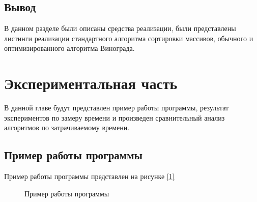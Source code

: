 \documentclass{article}
\begin{document}
	\subsection{Вывод}
	В данном разделе были описаны средства реализации, были представлены листинги реализации стандартного алгоритма сортировки массивов, обычного и оптимизированного алгоритма Винограда.

	\newpage
	\section{Экспериментальная часть}
	В данной главе будут представлен пример работы программы, результат экспериментов по замеру времени и произведен сравнительный анализ алгоритмов по затрачиваемому времени.
	\subsection{Пример работы программы}
	Пример работы программы представлен на рисунке \hyperref[programmWork]{[\ref{programmWork}]}
	 	\begin{figure}[h!]
		 	\caption{Пример работы программы}
		 	\label{programmWork}
	 	\end{figure}
	
\end{document}
